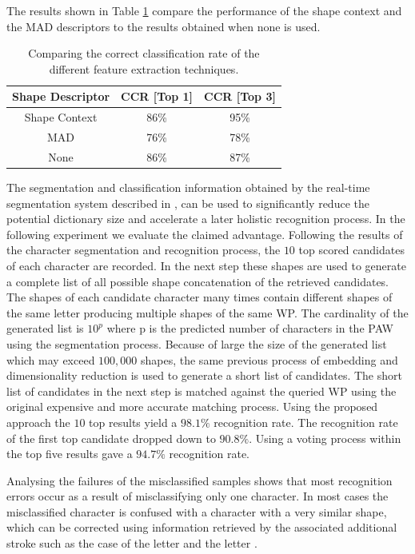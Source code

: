 \documentclass[10pt, conference, compsocconf]{IEEEtran}
\begin{document}
The results shown in Table \ref{table:features_comparison} compare the performance of the shape context and the MAD descriptors to the results obtained when none is used.

\begin{table}
\centering
\begin{tabular}{ | c | c | c |}
\hline
	Shape Descriptor  & CCR [Top 1]  & CCR [Top 3] \\
	\hline 
	Shape Context & 86\% & 95\%  \\                
  	\hline
  	MAD & 76\% & 78\% \\
  	\hline
  	None & 86\% &  87\% \\
  	\hline
\end{tabular}
\caption{Comparing the correct classification rate of the different feature extraction techniques.}
\label{table:features_comparison} 
\end{table}

The segmentation and classification information obtained by the real-time segmentation system described in \cite{kour2014real}, can be used to significantly reduce the potential dictionary size and accelerate a later holistic recognition process.
In the following experiment we evaluate the claimed advantage.
Following the results of the character segmentation and recognition process, the $10$ top scored candidates of each character are recorded. 
In the next step these shapes are used to generate a complete list of all possible shape concatenation of the retrieved candidates. 
The shapes of each candidate character many times contain different shapes of the same letter producing multiple shapes of the same WP. 
The cardinality of the generated list is $10^p$ where p is the predicted number of characters in the PAW using the segmentation process. 
Because of large the size of the generated list which may exceed $100,000$ shapes, the same previous process of embedding and dimensionality reduction is used to generate a short list of candidates. 
The short list of candidates in the next step is matched against the queried WP using the original expensive and more accurate matching process. 
Using the proposed approach the $10$ top results yield a $98.1\%$ recognition rate. 
The recognition rate of the first top candidate dropped down to $90.8\%$. 
Using a voting process within the top five results gave a $94.7\%$ recognition rate. 

Analysing the failures of the misclassified samples shows that most recognition errors occur as a result of misclassifying only one character. 
In most cases the misclassified character is confused with a character with a very similar shape, which can be corrected using information retrieved by the associated additional stroke such as the case of the letter  and the letter .
\end{document}
